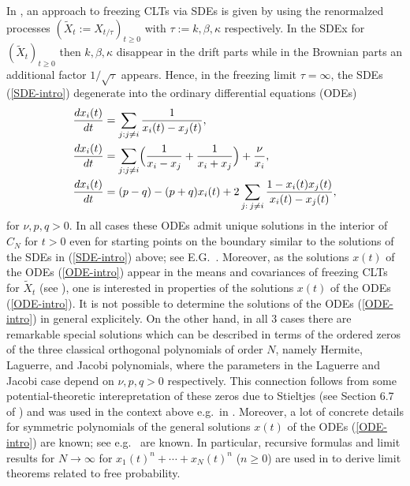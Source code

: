 \documentclass[reqno]{amsart}
\theoremstyle{plain}
\theoremstyle{definition}
\numberwithin{equation}{section}
\begin{document}
 In \cite{AV1, VW1}, an approach  to freezing CLTs via SDEs is given by using the renormalzed processes
  $(\tilde X_t:= X_{t/\tau})_{t\ge0}$  with $\tau:=k,\beta,\kappa$ respectively. In the SDEx for  $(\tilde X_t)_{t\ge0}$ then
   $k,\beta,\kappa$  disappear in the drift parts while in the Brownian parts an additional factor $1/\sqrt \tau$
  appears. Hence, in the freezing limit $\tau=\infty$, the SDEs  (\ref{SDE-intro}) degenerate into the 
  ordinary differential equations (ODEs)
\begin{align}\label{ODE-intro}
  \frac{dx_i(t)}{dt}&= \sum_{j:j\ne i} \frac{1}{x_i(t)-x_j(t)} ,\\
\frac{dx_i(t)}{dt}&= \sum_{j: j\ne i}\Bigl( \frac{1}{x_i-x_j}+  
\frac{1}{x_i+x_j}\Bigr)+\frac{\nu}{x_i}, \notag\\
  \frac{dx_i(t)}{dt}&= (p-q)-(p+q)x_i(t)
			+2\sum_{j:\> j\neq i}\frac{1-x_i(t)
			  x_j(t)}{x_i(t)-x_j(t)},\notag
\end{align}
for  $\nu, p,q>0$.
In all  cases these ODEs admit unique solutions in the interior of $C_N$ for $t>0$ even for starting points on the boundary
similar to the solutions of the SDEs in (\ref{SDE-intro}) above; see E.G.~\cite{VW3, AVW}. Moreover, as the solutions $x(t)$ of the ODEs (\ref{ODE-intro})
appear in the means and covariances of freezing CLTs for $\tilde X_t$ (see \cite{VW1}), one is interested in properties of the solutions
$x(t)$ of the ODEs (\ref{ODE-intro}).
It is not possible to determine the solutions  of the ODEs (\ref{ODE-intro}) in general explicitely.
On the other hand, in all 3 cases there are remarkable special solutions which can be described in terms of the ordered zeros of the
three classical  orthogonal polynomials of order $N$, namely Hermite, Laguerre, and Jacobi polynomials,
where the parameters in the Laguerre and Jacobi case depend on  $\nu, p,q>0$ respectively. This connection follows from some potential-theoretic
interepretation of these zeros due to Stieltjes (see Section 6.7 of \cite{S})
and was used in the context above e.g.~in \cite{AKM1, AKM2, AV1, AV2, HV, V, VW1}.
Moreover, a lot of concrete details for symmetric polynomials of the general solutions 
$x(t)$ of the ODEs (\ref{ODE-intro}) are known; see e.g.~\cite{AVW, KVW, RV2, V2, VW2, VW3} are known. In particular, recursive formulas and limit results for
$N\to\infty$ for $x_1(t)^n+\cdots+x_N(t)^n$ ($n\ge0$) are used in \cite{AVW, VW2} to derive limit theorems related to free probability.
\end{document}
